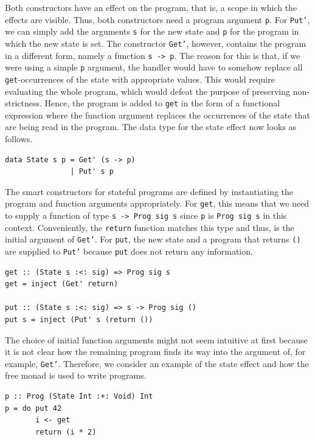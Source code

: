 \documentclass[a4paper, 11pt, fleqn, twoside]{scrreprt}
\newcommand{\hinl}[1]{\texttt{#1}}
\begin{document}
Both constructors have an effect on the program, that is, a scope in which the effects are visible.
Thus, both constructors need a program argument \hinl{p}.
For \hinl{Put'}, we can simply add the arguments \hinl{s} for the new state and \hinl{p} for the program in which the new state is set.
The constructor \hinl{Get'}, however, contains the program in a different form, namely a function \hinl{s -> p}.
The reason for this is that, if we were using a simple \hinl{p} argument, the handler would have to somehow replace all \hinl{get}-occurrences of the state with appropriate values.
This would require evaluating the whole program, which would defeat the purpose of preserving non-strictness.
Hence, the program is added to \hinl{get} in the form of a functional expression where the function argument replaces the occurrences of the state that are being read in the program.
The data type for the state effect now looks as follows.

\begin{verbatim}
data State s p = Get' (s -> p)
               | Put' s p
\end{verbatim}

The smart constructors for stateful programs are defined by instantiating the program and function arguments appropriately.
For \hinl{get}, this means that we need to supply a function of type \hinl{s -> Prog sig s} since \hinl{p} is \hinl{Prog sig s} in this context.
Conveniently, the \hinl{return} function matches this type and thus, is the initial argument of \hinl{Get'}.
For \hinl{put}, the new state and a program that returns \hinl{()} are supplied to \hinl{Put'} because \hinl{put} does not return any information.

\begin{verbatim}
get :: (State s :<: sig) => Prog sig s
get = inject (Get' return)

put :: (State s :<: sig) => s -> Prog sig ()
put s = inject (Put' s (return ())
\end{verbatim}

The choice of initial function arguments might not seem intuitive at first because it is not clear how the remaining program finds its way into the argument of, for example, \hinl{Get'}.
Therefore, we consider an example of the state effect and how the free monad is used to write programs.

\begin{verbatim}
p :: Prog (State Int :+: Void) Int
p = do put 42
       i <- get
       return (i * 2)
\end{verbatim}
\end{document}
